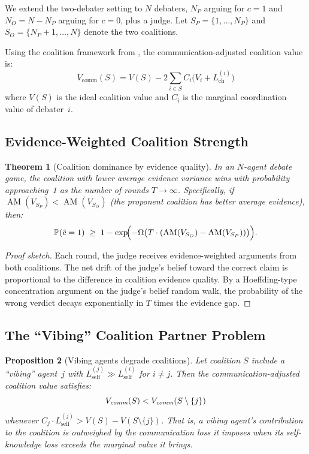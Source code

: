 \documentclass[11pt,a4paper]{article}
\newtheorem{theorem}{Theorem}[section]
\newtheorem{proposition}[theorem]{Proposition}
\DeclareMathOperator{\AM}{AM}
\newcommand{\Prob}{\mathbb{P}}
\newcommand{\Lself}{L_{\text{self}}}
\newcommand{\Lch}{L_{\text{ch}}}
\begin{document}
We extend the two-debater setting to $N$ debaters, $N_P$ arguing for
$c = 1$ and $N_O = N - N_P$ arguing for $c = 0$, plus a judge. Let
$S_P = \{1, \ldots, N_P\}$ and $S_O = \{N_P + 1, \ldots, N\}$ denote
the two coalitions.

Using the coalition framework from \cite{shcherbinin2026coop}, the
communication-adjusted coalition value is:
\begin{equation}\label{eq:coalition-debate}
    V_{\text{comm}}(S) = V(S) - 2\sum_{i \in S} C_i \bigl(V_i + \Lch^{(i)}\bigr)
\end{equation}
where $V(S)$ is the ideal coalition value and $C_i$ is the marginal
coordination value of debater~$i$.

\subsection{Evidence-Weighted Coalition Strength}

\begin{theorem}[Coalition dominance by evidence quality]
\label{thm:coalition-evidence}
In an $N$-agent debate game, the coalition with lower average evidence
variance wins with probability approaching~1 as the number of rounds
$T \to \infty$. Specifically, if
$\AM(V_{S_P}) < \AM(V_{S_O})$ (the proponent coalition has better
average evidence), then:
\begin{equation}
    \Prob(\hat{c} = 1) \;\geq\;
    1 - \exp\!\Bigl(-\Omega\bigl(T \cdot (\AM(V_{S_O}) - \AM(V_{S_P}))\bigr)\Bigr).
\end{equation}
\end{theorem}

\begin{proof}[Proof sketch]
Each round, the judge receives evidence-weighted arguments from both
coalitions. The net drift of the judge's belief toward the correct claim
is proportional to the difference in coalition evidence quality. By a
Hoeffding-type concentration argument on the judge's belief random walk,
the probability of the wrong verdict decays exponentially in $T$ times
the evidence gap.
\end{proof}

\subsection{The ``Vibing'' Coalition Partner Problem}

\begin{proposition}[Vibing agents degrade coalitions]
\label{prop:vibing-coalition}
Let coalition $S$ include a ``vibing'' agent~$j$ with
$\Lself^{(j)} \gg \Lself^{(i)}$ for $i \neq j$. Then the
communication-adjusted coalition value satisfies:
\begin{equation}
    V_{\emph{comm}}(S) < V_{\emph{comm}}(S \setminus \{j\})
\end{equation}
whenever $C_j \cdot \Lself^{(j)} > V(S) - V(S \setminus \{j\})$.
That is, a vibing agent's contribution to the coalition is outweighed
by the communication loss it imposes when its self-knowledge loss
exceeds the marginal value it brings.
\end{proposition}
\end{document}
